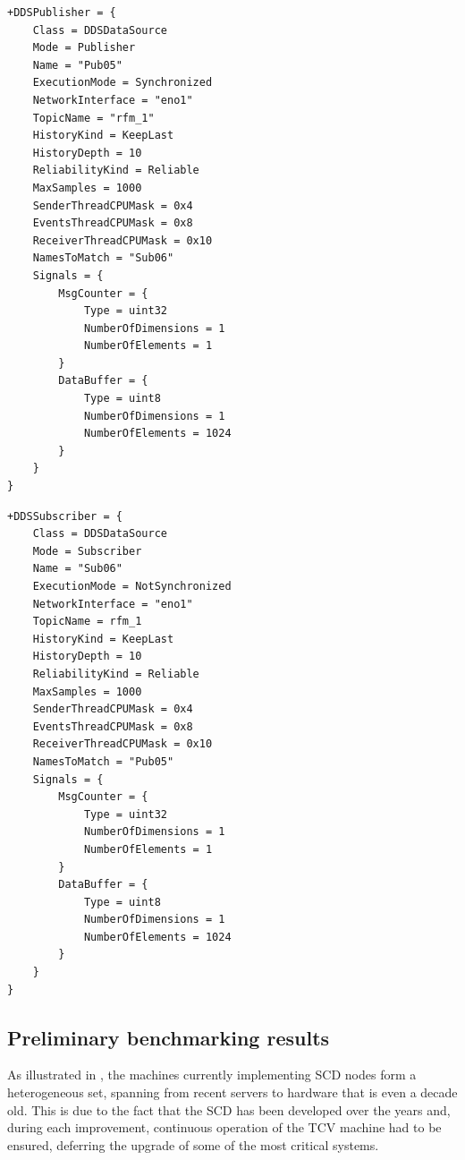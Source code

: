 \newpage
\begin{center}
\begin{minipage}[t]{.9\textwidth}
\begin{lstlisting}[caption={Sample configuration settings of a \texttt{Publisher} \texttt{DDSDataSource}.}, label={lst:ddsdatasource_pub}]
+DDSPublisher = {
    Class = DDSDataSource
    Mode = Publisher
    Name = "Pub05"
    ExecutionMode = Synchronized
    NetworkInterface = "eno1"
    TopicName = "rfm_1"
    HistoryKind = KeepLast
    HistoryDepth = 10
    ReliabilityKind = Reliable
    MaxSamples = 1000
    SenderThreadCPUMask = 0x4
    EventsThreadCPUMask = 0x8
    ReceiverThreadCPUMask = 0x10
    NamesToMatch = "Sub06"
    Signals = {
        MsgCounter = {
            Type = uint32
            NumberOfDimensions = 1
            NumberOfElements = 1
        }
        DataBuffer = {
            Type = uint8
            NumberOfDimensions = 1
            NumberOfElements = 1024
        }
    }
}
\end{lstlisting}
\end{minipage}
\end{center}

\newpage
\begin{center}
\begin{minipage}[t]{.9\textwidth}
\begin{lstlisting}[caption={Sample configuration settings of a \texttt{Subscriber} \texttt{DDSDataSource}.}, label={lst:ddsdatasource_sub}]
+DDSSubscriber = {
    Class = DDSDataSource
    Mode = Subscriber
    Name = "Sub06"
    ExecutionMode = NotSynchronized
    NetworkInterface = "eno1"
    TopicName = rfm_1
    HistoryKind = KeepLast
    HistoryDepth = 10
    ReliabilityKind = Reliable
    MaxSamples = 1000
    SenderThreadCPUMask = 0x4
    EventsThreadCPUMask = 0x8
    ReceiverThreadCPUMask = 0x10
    NamesToMatch = "Pub05"
    Signals = {
        MsgCounter = {
            Type = uint32
            NumberOfDimensions = 1
            NumberOfElements = 1
        }
        DataBuffer = {
            Type = uint8
            NumberOfDimensions = 1
            NumberOfElements = 1024
        }
    }
}
\end{lstlisting}
\end{minipage}
\end{center}

\subsection{Preliminary benchmarking results}
\label{sec:ddsdatasource_benchmark}
As illustrated in \cite{galperti_overview_2024}, the machines currently implementing SCD nodes form a heterogeneous set, spanning from recent servers to hardware that is even a decade old. This is due to the fact that the SCD has been developed over the years and, during each improvement, continuous operation of the TCV machine had to be ensured, deferring the upgrade of some of the most critical systems.

